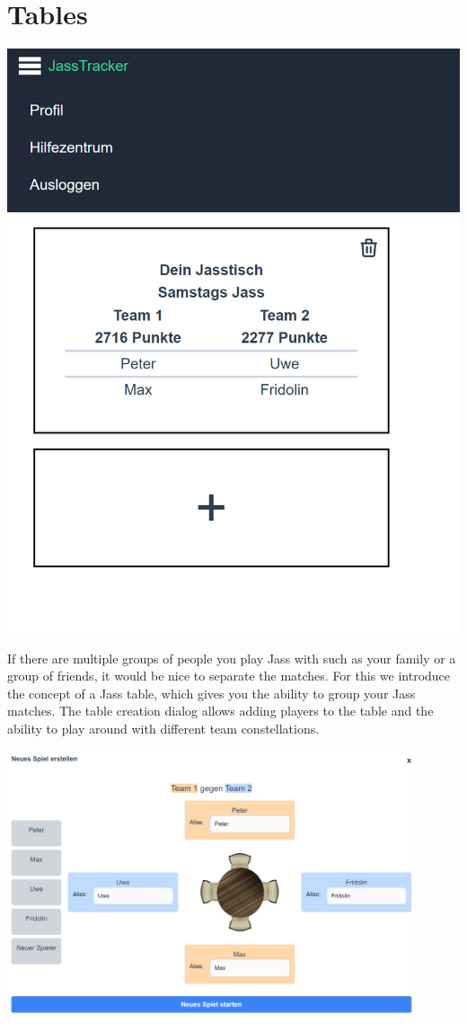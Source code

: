 \section*{Tables}
\includegraphics[height=0.5\textheight]{resources/screenshots/tables}

If there are multiple groups of people you play Jass with such as your family or a group of friends, it would be nice to separate the matches. For this we introduce the concept of a Jass table, which gives you the ability to group your Jass matches. The table creation dialog allows adding players to the table and the ability to play around with different team constellations.

\includegraphics[width=0.9\textwidth]{resources/screenshots/table-creation}

